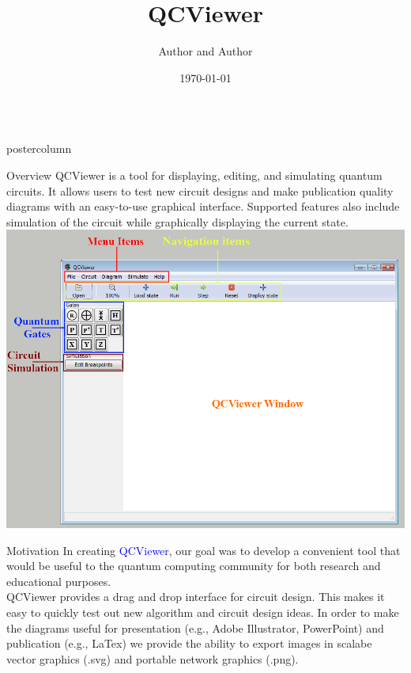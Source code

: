 \documentclass[final]{beamer} %
\title[QCViewer]{QCViewer}
\author[Author]{Author and Author}
\institute[IQC, University of Waterloo]{Quantum Circuits group, IQC, University of Waterloo}
\date{\today}
\begin{document}
  \begin{frame}{} 
  \begin{columns}
   
    \begin{column}{.33\textwidth}
      \begin{beamercolorbox}[center,wd=\textwidth]{postercolumn}
         \begin{minipage}[T]{.95\textwidth}
           \begin{block}{\large Overview}
	QCViewer is a tool for displaying, editing, and simulating quantum circuits. It allows users to test new circuit designs and make publication quality diagrams with an easy-to-use graphical interface. Supported features also include simulation of the circuit while graphically displaying the current state. 
             \centering 
             \includegraphics{figures/QCViewerGUI.png}
           \end{block}

           \begin{block}{\large Motivation}
             In creating \textcolor{blue}{QCViewer}, our goal was to develop a convenient tool that would be useful to 
             the quantum computing community for both research and educational purposes. 
	\newline
	\\
             QCViewer provides a drag and drop interface for circuit design. This makes it easy to quickly 
             test out new algorithm and circuit design ideas. In order to make the diagrams useful for presentation 
             (e.g., Adobe Illustrator, PowerPoint) and publication (e.g., LaTex) we provide the ability to export 
             images in scalabe vector graphics (.svg) and portable network graphics (.png).


\end{block}
\end{minipage}
\end{beamercolorbox}
\end{column}
\end{columns}
\end{frame}
\end{document}
